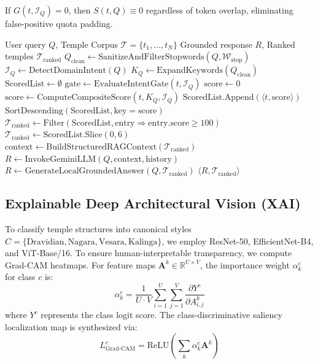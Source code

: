 \documentclass[lettersize,journal]{IEEEtran}
\begin{document}
If $G(t, \mathcal{I}_Q) = 0$, then $S(t, Q) \equiv 0$ regardless of token overlap, eliminating false-positive quota padding.

\begin{algorithm}[H]
\caption{Strict Intent-Gated Grounded Retrieval \& Synthesis}
\begin{algorithmic}[1]
\REQUIRE User query $Q$, Temple Corpus $\mathcal{T} = \{t_1, \dots, t_N\}$
\ENSURE Grounded response $R$, Ranked temples $\mathcal{T}_{\text{ranked}}$
\STATE $Q_{\text{clean}} \leftarrow \text{SanitizeAndFilterStopwords}(Q, \mathcal{W}_{\text{stop}})$
\STATE $\mathcal{I}_Q \leftarrow \text{DetectDomainIntent}(Q)$
\STATE $K_Q \leftarrow \text{ExpandKeywords}(Q_{\text{clean}})$
\STATE $\text{ScoredList} \leftarrow \emptyset$
    \STATE $\text{gate} \leftarrow \text{EvaluateIntentGate}(t, \mathcal{I}_Q)$
        \STATE $\text{score} \leftarrow 0$
    \ELSE
        \STATE $\text{score} \leftarrow \text{ComputeCompositeScore}(t, K_Q, \mathcal{I}_Q)$
    \ENDIF
        \STATE $\text{ScoredList.Append}(\langle t, \text{score} \rangle)$
    \ENDIF
\ENDFOR
\STATE $\text{SortDescending}(\text{ScoredList}, \text{key}=\text{score})$
    \STATE $\mathcal{T}_{\text{ranked}} \leftarrow \text{Filter}(\text{ScoredList}, \text{entry} \Rightarrow \text{entry.score} \ge 100)$
\ELSE
    \STATE $\mathcal{T}_{\text{ranked}} \leftarrow \text{ScoredList.Slice}(0, 6)$
\ENDIF
{}
    \STATE $\text{context} \leftarrow \text{BuildStructuredRAGContext}(\mathcal{T}_{\text{ranked}})$
    \STATE $R \leftarrow \text{InvokeGeminiLLM}(Q, \text{context}, \text{history})$
\ELSE
    \STATE $R \leftarrow \text{GenerateLocalGroundedAnswer}(Q, \mathcal{T}_{\text{ranked}})$
\ENDIF
\RETURN $\langle R, \mathcal{T}_{\text{ranked}} \rangle$
\end{algorithmic}
\end{algorithm}

\subsection{Explainable Deep Architectural Vision (XAI)}
To classify temple structures into canonical styles $C = \{\text{Dravidian}, \text{Nagara}, \text{Vesara}, \text{Kalinga}\}$, we employ ResNet-50, EfficientNet-B4, and ViT-Base/16. To ensure human-interpretable transparency, we compute Grad-CAM heatmaps. For feature maps $\mathbf{A}^k \in \mathbb{R}^{U \times V}$, the importance weight $\alpha_k^c$ for class $c$ is:
\begin{equation}
\alpha_k^c = \frac{1}{U \cdot V} \sum_{i=1}^U \sum_{j=1}^V \frac{\partial Y^c}{\partial A_{i,j}^k}
\end{equation}
where $Y^c$ represents the class logit score. The class-discriminative saliency localization map is synthesized via:
\begin{equation}
L^c_{\text{Grad-CAM}} = \text{ReLU} \left( \sum_k \alpha_k^c \mathbf{A}^k \right)
\end{equation}
\end{document}
